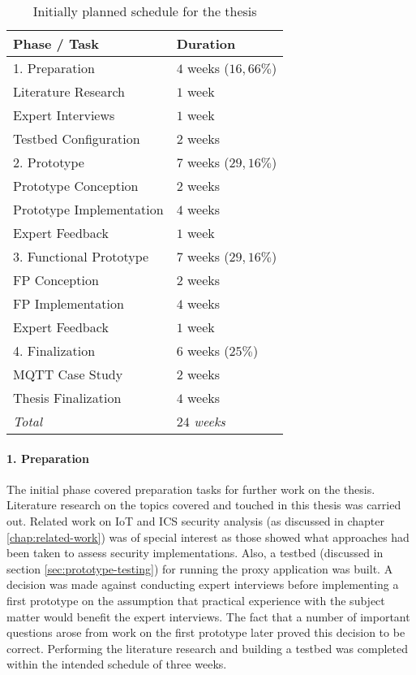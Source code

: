 \begin{table}
    \centering
    \begin{tabular}{l l}
        \toprule
        Phase / Task             & Duration              \\
        \midrule
        1. Preparation           & $4$ weeks ($16,66\%$) \\
        \midrule
        Literature Research      & $1$ week              \\
        Expert Interviews        & $1$ week              \\
        Testbed Configuration    & $2$ weeks             \\
        \midrule
        2. Prototype             & $7$ weeks ($29,16\%$) \\
        \midrule
        Prototype Conception     & $2$ weeks             \\
        Prototype Implementation & $4$ weeks             \\
        Expert Feedback          & $1$ week              \\
        \midrule
        3. Functional Prototype  & $7$ weeks ($29,16\%$) \\
        \midrule
        FP Conception            & $2$ weeks             \\
        FP Implementation        & $4$ weeks             \\
        Expert Feedback          & $1$ week              \\
        \midrule
        4. Finalization          & $6$ weeks ($25\%$)    \\
        \midrule
        MQTT Case Study          & $2$ weeks             \\
        Thesis Finalization      & $4$ weeks             \\
        \midrule
        \midrule
        \emph{Total}             & \emph{$24$ weeks}     \\
        \bottomrule
    \end{tabular}
    \caption{Initially planned schedule for the thesis}
    \label{fig:thesis-schedule}
\end{table}

\paragraph{1. Preparation} The initial phase covered preparation tasks for further work on the thesis. Literature research on the topics covered and touched in this thesis was carried out. Related work on \ac{IoT} and \ac{ICS} security analysis (as discussed in chapter \ref{chap:related-work}) was of special interest as those showed what approaches had been taken to assess security implementations. Also, a testbed (discussed in section \ref{sec:prototype-testing}) for running the proxy application was built. A decision was made against conducting expert interviews before implementing a first prototype on the assumption that practical experience with the subject matter would benefit the expert interviews. The fact that a number of important questions arose from work on the first prototype later proved this decision to be correct. Performing the literature research and building a testbed was completed within the intended schedule of three weeks.
